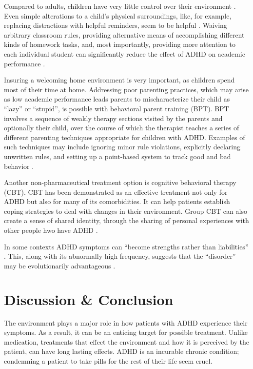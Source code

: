 \documentclass[a4paper,11pt]{article}
\begin{document}
  Compared to adults, children have very little control over their environment \cite{adhdcontext}.
  Even simple alterations to a child's physical surroundings,
  like, for example, replacing distractions with helpful reminders,
  seem to be helpful \cite{thebook}.
  Waiving arbitrary classroom rules, providing alternative means of accomplishing different kinds of homework tasks,
  and, most importantly, providing more attention to each individual student
  can significantly reduce the effect of ADHD on academic performance \cite{ervin1998classroom}.

  Insuring a welcoming home environment is very important, as children spend most of their time at home.
  Addressing poor parenting practices, which may arise as
  low academic performance leads parents to mischaracterize their child as ``lazy'' or ``stupid'',
  is possible with behavioral parent training (BPT).
  BPT involves a sequence of weakly therapy sections visited by the parents and optionally their child,
  over the course of which the therapist teaches a series of different parenting techniques appropriate for children with ADHD.
  Examples of such techniques may include
  ignoring minor rule violations,
  explicitly declaring unwritten rules, and
  setting up a point-based system to track good and bad behavior \cite{parenttraining}.

  Another non-pharmaceutical treatment option is cognitive behavioral therapy (CBT).
  CBT has been demonstrated as an effective treatment not only for ADHD but also for many of its comorbidities.
  It can help patients establish coping strategies to deal with changes in their environment.
  Group CBT can also create a sense of shared identity, through the sharing of personal experiences with other people hwo have ADHD
  \cite{bramham2009evaluation}.

  In some contexts ADHD symptoms can ``become strengths rather than liabilities'' \cite{adhdcontext}.
  This, along with its abnormally high frequency, suggests that the ``disorder''
  may be evolutionarily advantageous \cite{jensen1997evolution}.

  \section{Discussion \& Conclusion}
  The environment plays a major role in how patients with ADHD experience their symptoms.
  As a result, it can be an enticing target for possible treatment.
  Unlike medication, treatments that effect the environment and how it is perceived by the patient, can have long lasting effects.
  ADHD is an incurable chronic condition; condemning a patient to take pills for the rest of their life seem cruel.
\end{document}
